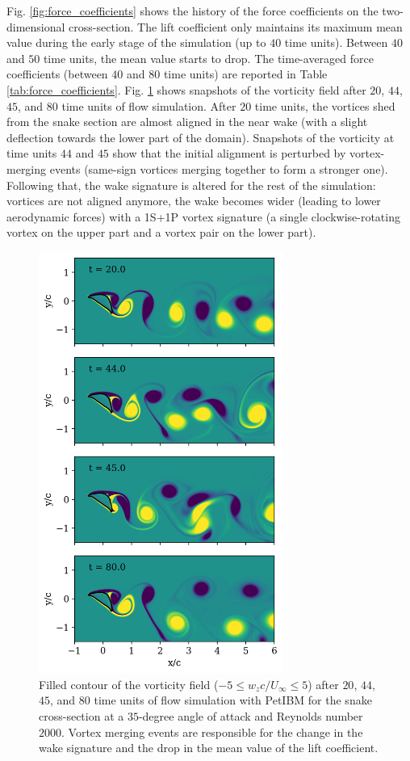 \documentclass[10pt,journal,compsoc]{IEEEtran}
\begin{document}
Fig. \ref{fig:force_coefficients} shows the history of the force coefficients on the two-dimensional cross-section.
The lift coefficient only maintains its maximum mean value during the early stage of the simulation (up to $40$ time units).
Between $40$ and $50$ time units, the mean value starts to drop.
The time-averaged force coefficients (between $40$ and $80$ time units) are reported in Table \ref{tab:force_coefficients}.
Fig. \ref{fig:wz_2d} shows snapshots of the vorticity field after $20$, $44$, $45$, and $80$ time units of flow simulation.
After $20$ time units, the vortices shed from the snake section are almost aligned in the near wake (with a slight deflection towards the lower part of the domain).
Snapshots of the vorticity at time units $44$ and $45$ show that the initial alignment is perturbed by vortex-merging events (same-sign vortices merging together to form a stronger one).
Following that, the wake signature is altered for the rest of the simulation: vortices are not aligned anymore, the wake becomes wider (leading to lower aerodynamic forces) with a 1S+1P vortex signature (a single clockwise-rotating vortex on the upper part and a vortex pair on the lower part).

\begin{figure}[!h]
    \centering
    \includegraphics[width=8cm]{figures/wz_multi_contourf.png}
    \caption{Filled contour of the vorticity field ($-5 \leq w_z c / U_\infty \leq 5$) after $20$, $44$, $45$, and $80$ time units of flow simulation with PetIBM for the snake cross-section at a $35$-degree angle of attack and Reynolds number $2000$. Vortex merging events are responsible for the change in the wake signature and the drop in the mean value of the lift coefficient.}
    \label{fig:wz_2d}
\end{figure}
\end{document}
